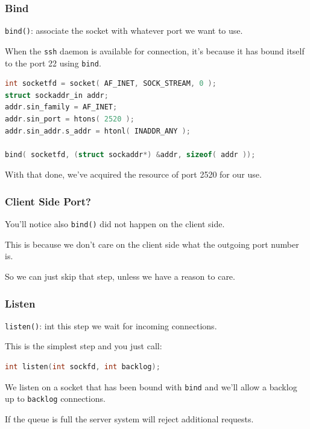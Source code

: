 \begin{frame}[fragile]
\frametitle{Bind}

\texttt{bind()}: associate the socket with whatever port we want to use. 

When the \texttt{ssh} daemon is available for connection, it's because it has bound itself to the port 22 using \texttt{bind}. 

\begin{lstlisting}[language=C]
int socketfd = socket( AF_INET, SOCK_STREAM, 0 );
struct sockaddr_in addr;
addr.sin_family = AF_INET;
addr.sin_port = htons( 2520 );
addr.sin_addr.s_addr = htonl( INADDR_ANY );

bind( socketfd, (struct sockaddr*) &addr, sizeof( addr ));
\end{lstlisting}

With that done, we've acquired the resource of port 2520 for our use.

\end{frame}


\begin{frame}
\frametitle{Client Side Port?}

You'll notice also \texttt{bind()} did not happen on the client side. 

This is because we don't care on the client side what the outgoing port number is. 

So we can just skip that step, unless we have a reason to care.

\end{frame}


\begin{frame}[fragile]
\frametitle{Listen}

\texttt{listen()}: int this step we wait for incoming connections. 

This is the simplest step and you just call:

\begin{lstlisting}[language=C]
int listen(int sockfd, int backlog); 
\end{lstlisting}

We listen on a socket that has been bound with \texttt{bind} and we'll allow a backlog up to \texttt{backlog} connections. 

If the queue is full the server system will reject additional requests.


\end{frame}


